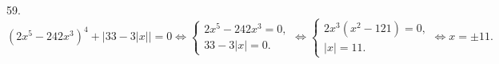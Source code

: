 59. $(2x^5-242x^3)^4+\left |33-3|x|\right|=0\Leftrightarrow \begin{cases}2x^5-242x^3=0,\\
33-3|x|=0.\end{cases}\Leftrightarrow\begin{cases}2x^3(x^2-121)=0,\\
|x|=11.\end{cases}\Leftrightarrow x=\pm11.$\\
